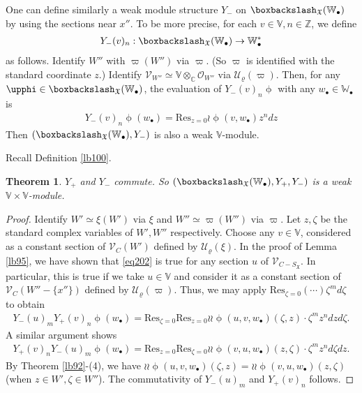 \documentclass[12pt,a4paper,notitlepage]{report}
\theoremstyle{definition}
\theoremstyle{plain}
\newtheorem{thm}[df]{Theorem}
\newcommand{\fk}{\mathfrak}
\newcommand{\mc}{\mathcal}
\newcommand{\Res}{\mathrm{Res}}
\newcommand{\scr}{\mathscr}
\newcommand{\SX}{S_{\fk X}}
\newcommand{\blt}{\bullet}
\newcommand{\Vbb}{\mathbb V}
\newcommand{\Wbb}{\mathbb W}
\newcommand{\Cbb}{\mathbb C}
\newcommand{\Zbb}{\mathbb Z}
\numberwithin{equation}{section}
\begin{document}
One can define similarly a weak module structure $Y_-$ on $\boxbackslash_{\fk X}(\Wbb_\blt)$ by using the sections near $x''$. To be more precise, for each $v\in\Vbb,n\in\Zbb$, we define
\begin{gather*}
Y_-(v)_n:\boxbackslash_{\fk X}(\Wbb_\blt)\rightarrow\Wbb_\blt^*
\end{gather*}
as follows. Identify $W''$ with $\varpi(W'')$ via $\varpi$. (So $\varpi$ is identified with the standard coordinate $z$.) Identify  $\scr V_{W''}\simeq\Vbb\otimes_\Cbb\scr O_{W''}$ via $\mc U_\varrho(\varpi)$.  Then, for any $\upphi\in\boxbackslash_{\fk X}(\Wbb_\blt)$, the evaluation of $Y_-(v)_n\upphi$ with any $w_\blt\in\Wbb_\blt$ is
\begin{gather}
\boxed{~~Y_-(v)_n\upphi(w_\blt)=\Res_{z=0}\wr\upphi( v,w_\blt)z^ndz~~}\label{eq213}
\end{gather}
Then $(\boxbackslash_{\fk X}(\Wbb_\blt),Y_-)$ is also a weak $\Vbb$-module.

Recall Definition \ref{lb100}.

\begin{thm}
$Y_+$ and $Y_-$ commute. So $(\boxbackslash_{\fk X}(\Wbb_\blt),Y_+,Y_-)$ is a weak $\Vbb\times\Vbb$-module.
\end{thm}


\begin{proof}
Identify $W'\simeq \xi(W')$ via $\xi$ and $W''\simeq\varpi(W'')$ via $\varpi$. Let $z,\zeta$ be the standard complex variables of $W',W''$ respectively.  Choose any $v\in\Vbb$, considered as a constant section of $\scr V_C(W')$ defined by $\mc U_\varrho(\xi)$.  In the proof of Lemma \ref{lb95}, we have shown that \eqref{eq202} is true for any section $u$ of $\scr V_{C-\SX}$. In particular, this is true if we take $u\in\Vbb$ and consider it as a constant section of $\scr V_C(W''-\{x''\})$ defined by $\mc U_\varrho(\varpi)$.  Thus, we may apply $\Res_{\zeta=0}(\cdots)\zeta^md\zeta$ to obtain
\begin{align*}
Y_-(u)_m Y_+(v)_n\upphi(w_\blt)=\Res_{\zeta=0}\Res_{z=0}\wr\wr\upphi(u,v,w_\blt)(\zeta,z)\cdot \zeta^m z^n dzd\zeta.
\end{align*}
A similar argument shows
\begin{align*}
Y_+(v)_nY_-(u)_m\upphi(w_\blt)=\Res_{z=0}\Res_{\zeta=0}\wr\wr\upphi(v,u,w_\blt)(z,\zeta)\cdot\zeta^m z^n d\zeta dz.
\end{align*}
By Theorem \ref{lb92}-(4), we have $\wr\wr\upphi(u,v,w_\blt)(\zeta,z)=\wr\wr\upphi(v,u,w_\blt)(z,\zeta)$ (when $z\in W',\zeta\in W''$). The commutativity of  $Y_-(u)_m$ and $Y_+(v)_n$ follows.
\end{proof}
\end{document}
